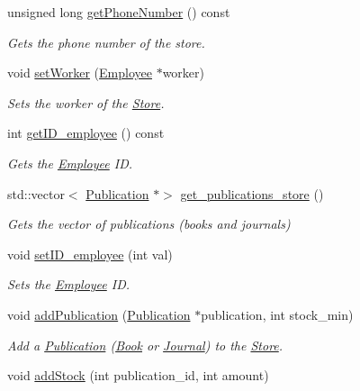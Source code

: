 \begin{DoxyCompactItemize}
unsigned long \hyperlink{class_store_afbef10a37143ea91b200d50e8e6b83d7}{get\+Phone\+Number} () const
\begin{DoxyCompactList}\small\item\em Gets the phone number of the store. \end{DoxyCompactList}\item 
void \hyperlink{class_store_a5486a87318c219a4cc85438c9b171ffc}{set\+Worker} (\hyperlink{class_employee}{Employee} $\ast$worker)
\begin{DoxyCompactList}\small\item\em Sets the worker of the \hyperlink{class_store}{Store}. \end{DoxyCompactList}\item 
int \hyperlink{class_store_a6b828ab56ffdcf4c8eb64e53ab998543}{get\+I\+D\+\_\+employee} () const
\begin{DoxyCompactList}\small\item\em Gets the \hyperlink{class_employee}{Employee} ID. \end{DoxyCompactList}\item 
std\+::vector$<$ \hyperlink{class_publication}{Publication} $\ast$$>$ \hyperlink{class_store_a05e802d26ede5fc4225074d1c732b3f3}{get\+\_\+publications\+\_\+store} ()
\begin{DoxyCompactList}\small\item\em Gets the vector of publications (books and journals) \end{DoxyCompactList}\item 
void \hyperlink{class_store_a2d721f632d90947fae8c9eaa9f8abfcb}{set\+I\+D\+\_\+employee} (int val)
\begin{DoxyCompactList}\small\item\em Sets the \hyperlink{class_employee}{Employee} ID. \end{DoxyCompactList}\item 
void \hyperlink{class_store_aaea321fd77af274c34e8ade71ed02aa7}{add\+Publication} (\hyperlink{class_publication}{Publication} $\ast$publication, int stock\+\_\+min)
\begin{DoxyCompactList}\small\item\em Add a \hyperlink{class_publication}{Publication} (\hyperlink{class_book}{Book} or \hyperlink{class_journal}{Journal}) to the \hyperlink{class_store}{Store}. \end{DoxyCompactList}\item 
void \hyperlink{class_store_a67bad0d70942ce8560926110297fdf33}{add\+Stock} (int publication\+\_\+id, int amount)
$$
\end{DoxyCompactItemize}
